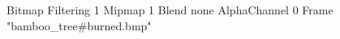 {Bitmap
	{Filtering 1}
	{Mipmap 1}
	{Blend none}
	{AlphaChannel 0}
	{Frame "bamboo_tree#burned.bmp"}
}

